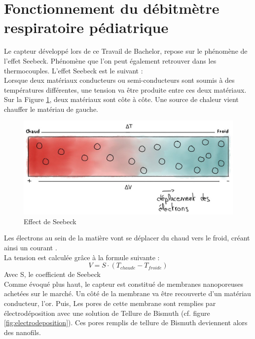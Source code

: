 \section{Fonctionnement du débitmètre respiratoire pédiatrique}
Le capteur développé lors de ce Travail de Bachelor, repose sur le phénomène de l'effet Seebeck. Phénomène que l'on peut également retrouver 
dans les thermocouples. L'effet Seebeck est le suivant :\\
Lorsque deux matériaux conducteurs ou semi-conducteurs sont soumis à des températures différentes, une tension va être produite entre ces deux matériaux. \\
Sur la Figure \ref{fig:Seebeck}, deux matériaux sont côte à côte. Une source de chaleur vient chauffer le matériau de gauche. 
\begin{figure}[H]
    \centering
    \includegraphics[scale = 0.3]{images/Seebeck.jpg}
    \caption{Effect de Seebeck}
    \label{fig:Seebeck}
\end{figure}
Les électrons au sein de la matière vont se déplacer du chaud vers le froid, créant ainsi un courant \cite{instrumentys_effet_2021}.\\
La tension est calculée grâce à la formule suivante :
\[V = S \cdot (T_{chaude} - T_{froide})\]
Avec S, le coefficient de Seebeck\\
Comme évoqué plus haut, le capteur est constitué de membranes nanoporeuses achetées sur le marché. 
Un côté de la membrane va être recouverte d'un matériau conducteur, l'or. Puis, Les pores de cette membrane sont remplies par 
électrodéposition avec une solution de Tellure de Bismuth (cf. figure \ref{fig:electrodeposition}). Ces pores remplis de tellure de 
Bismuth deviennent alors des nanofils. 
